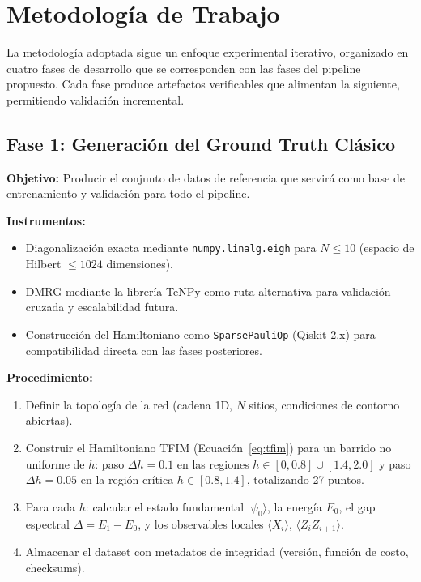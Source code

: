 \documentclass[11pt,a4paper,spanish]{book}
\begin{document}
\section{Metodología de Trabajo}

La metodología adoptada sigue un enfoque experimental iterativo, organizado en cuatro fases de desarrollo que se corresponden con las fases del pipeline propuesto. Cada fase produce artefactos verificables que alimentan la siguiente, permitiendo validación incremental.

\subsection{Fase 1: Generación del Ground Truth Clásico}

\textbf{Objetivo:} Producir el conjunto de datos de referencia que servirá como base de entrenamiento y validación para todo el pipeline.

\textbf{Instrumentos:}
\begin{itemize}
    \item Diagonalización exacta mediante \texttt{numpy.linalg.eigh} para $N \leq 10$ (espacio de Hilbert $\leq 1024$ dimensiones).
    \item DMRG mediante la librería TeNPy \citep{hauschild2018} como ruta alternativa para validación cruzada y escalabilidad futura.
    \item Construcción del Hamiltoniano como \texttt{SparsePauliOp} (Qiskit 2.x) para compatibilidad directa con las fases posteriores.
\end{itemize}

\textbf{Procedimiento:}
\begin{enumerate}
    \item Definir la topología de la red (cadena 1D, $N$ sitios, condiciones de contorno abiertas).
    \item Construir el Hamiltoniano TFIM (Ecuación~\ref{eq:tfim}) para un barrido no uniforme de $h$: paso $\Delta h = 0.1$ en las regiones $h \in [0, 0.8] \cup [1.4, 2.0]$ y paso $\Delta h = 0.05$ en la región crítica $h \in [0.8, 1.4]$, totalizando 27 puntos.
    \item Para cada $h$: calcular el estado fundamental $|\psi_0\rangle$, la energía $E_0$, el gap espectral $\Delta = E_1 - E_0$, y los observables locales $\langle X_i \rangle$, $\langle Z_i Z_{i+1} \rangle$.
    \item Almacenar el dataset con metadatos de integridad (versión, función de costo, checksums).
\end{enumerate}
\end{document}
